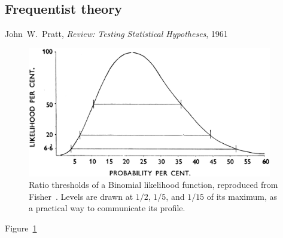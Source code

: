 \begin{singlespacing}
\section{Frequentist theory}
\label{sec:searches_frequentist}
\begin{epigraphs}
%
{John~W.~Pratt,
\textit{Review: Testing Statistical Hypotheses},
1961~\cite{pratt1961testing}}
\end{epigraphs}
\end{singlespacing}

\begin{figure}[tp]
\centering
\includegraphics[width=0.95\textwidth]{figures/seacrhes_fisher_likelihood_binomial.png}
\caption[
Ratio thresholds of a Binomial likelihood function, reproduced from Fisher
]{%
Ratio thresholds of a Binomial likelihood function, reproduced from
Fisher~\cite{fisher1956statistical}.
Levels are drawn at $1/2$, $1/5$, and $1/15$ of its maximum, as a practical way
to communicate its profile.
}
\label{fig:searches_fisher_likelihood}
\end{figure}

Figure~\ref{fig:searches_fisher_likelihood}

